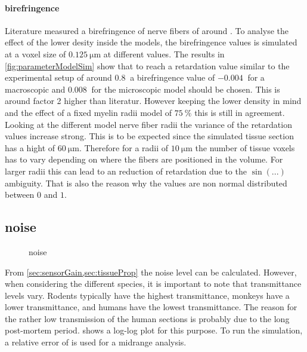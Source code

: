 % 
%
% 
\paragraph{birefringence}
% 
Literature measured a birefringence of nerve fibers of around \dummy{}. 
To analyse the effect of the lower desity inside the models, the birefringence values is simulated at a voxel size of $\SI{0.125}{\micro\meter}$ at different values.
The results in \cref{fig:parameterModelSim} show that to reach a retardation value similar to the experimental setup of around $\SI{0.8}{}$ a birefringence value of $\SI{-0.004}{}$ for a macroscopic and $\SI{0.008}{}$ for the microscopic model should be chosen.
This is around factor 2  higher than literatur.
However keeping the lower density in mind and the effect of a fixed myelin radii model of $\SI{75}{\percent}$ this is still in agreement.
Looking at the different model nerve fiber radii the variance of the retardation values increase strong.
This is to be expected since the simulated tissue section has a hight of $\SI{60}{\micro\meter}$.
Therefore for a radii of $\SI{10}{\micro\meter}$ the number of tissue voxels has to vary depending on where the fibers are positioned in the volume.
For larger radii this can lead to an reduction of retardation due to the $\sin(...)$ ambiguity.
That is also the reason why the values are non normal distributed between $\si{0}$ and $\si{1}$.
%  
% 
% 
\subsection{noise}
% 
\begin{figure}[!t]
\centering
{}
\caption[noise plot]{noise \dummy{}}
\label{fig:noiseplot}
\end{figure}
% 
From \cref{sec:sensorGain,sec:tissueProp} the noise level can be calculated.
However, when considering the different species, it is important to note that transmittance levels vary.
Rodents typically have the highest transmittance, monkeys have a lower transmittance, and humans have the lowest transmittance.
The reason for the rather low transmission of the human sections is probably due to the long post-mortem period.
 shows a log-log plot for this purpose.
To run the simulation, a relative error of \dummy{} is used for a midrange analysis.
% 
% 
% 

